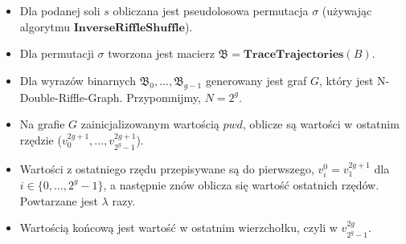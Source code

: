 \begin{itemize}
	\item Dla podanej soli $s$ obliczana jest pseudolosowa permutacja $\sigma$ (używając algorytmu $\mathbf{InverseRiffleShuffle}$).
	
	\item Dla permutacji $\sigma$ tworzona jest macierz $\mathfrak{B} = \mathbf{TraceTrajectories}(B)$.
	
	\item Dla wyrazów binarnych $\mathfrak{B}_{0},\dots,\mathfrak{B}_{g-1}$ generowany jest graf $G$, który jest N-Double-Riffle-Graph. Przypomnijmy, $N = 2 ^ {g}$.
	
	\item Na grafie $G$ zainicjalizowanym wartością $pwd$, oblicze są wartości w ostatnim rzędzie ($v_{0}^{2g+1},\dots,v_{2^{g} - 1}^{2g + 1}$).
	
	\item Wartości z ostatniego rzędu przepisywane są do pierwszego, $v_{i}^{0} = v_{1}^{2g+1}$ dla $i \in \{ 0,\dots,2^{g}-1 \}$, a następnie znów oblicza się wartość ostatnich rzędów. Powtarzane jest $\lambda$ razy.
	
	\item Wartością końcową jest wartość w ostatnim wierzchołku, czyli w $v_{2^{g} - 1}^{2g}$.
\end{itemize}

